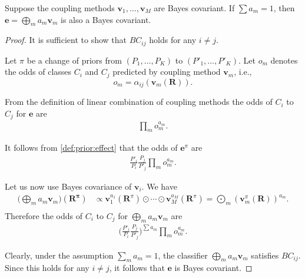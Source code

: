 \begin{prop}
	\label{prop:ensemble}
Suppose the coupling methods $\boldsymbol{v}_1, \ldots, \boldsymbol{v}_M$ are Bayes covariant. If $\sum a_m = 1$, then $\boldsymbol{e} = \bigoplus_m a_m \boldsymbol{v}_m$ is also a Bayes covariant.
\end{prop}

\begin{proof}
It is sufficient to show that $BC_{ij}$ holds for any $i\not= j$. 

Let $\pi$ be a change of priors from $(P_1, \ldots, P_K)$  to $(P'_1, \ldots, P'_K)$. Let $o_m$ denotes the odds of classes $C_i$ and $C_j$ predicted by coupling method $\boldsymbol{v}_m$, i.e.,
$$
o_m = \alpha_{ij}(\boldsymbol{v}_m(\boldsymbol{R})).
$$

From the definition of linear combination of coupling methods the odds of $C_i$ to $C_j$ for $\boldsymbol{e}$ are
\begin{align}
\prod_m o_m^{a_m}.
\end{align}

It follows from \eqref{def:prior:effect} that the odds of $\boldsymbol{e}^\pi$ are 
\begin{align}
\frac{P'_i}{P_i} \frac{P_j}{P'_j} \prod_m o_m^{a_m}.
\end{align}

Let us now use Bayes covariance of $\boldsymbol{v}_i$. 
We have
\begin{align}
	\biggl(\bigoplus_m a_m \boldsymbol{v}_m\biggr)(\boldsymbol{R^\pi}) & \propto 
	\boldsymbol{v}_1^{a_1}(\boldsymbol{R}^\pi) \odot \cdots \odot \boldsymbol{v}_M^{a_M}(\boldsymbol{R}^\pi) =  \bigodot_m  (\boldsymbol{v}_m^\pi(\boldsymbol{R}))^{a_m}. \\
\end{align}
Therefore the odds of $C_i$ to $C_j$ for $\bigoplus_m a_m \boldsymbol{v}_m$ are 
\begin{align}
\biggl(\frac{P'_i}{P_i} \frac{P_j}{P'_j} \biggr)^{\sum a_m} \prod_m o_m^{a_m}.
\end{align}

Clearly, under the assumption $\sum_m a_m = 1$, the classifier $\bigoplus_m a_m \boldsymbol{v}_m$ satisfies $BC_{ij}$. Since this holds for any $i\not=j$,  it follows that $\boldsymbol{e}$ is Bayes covariant.
\end{proof}


% 

